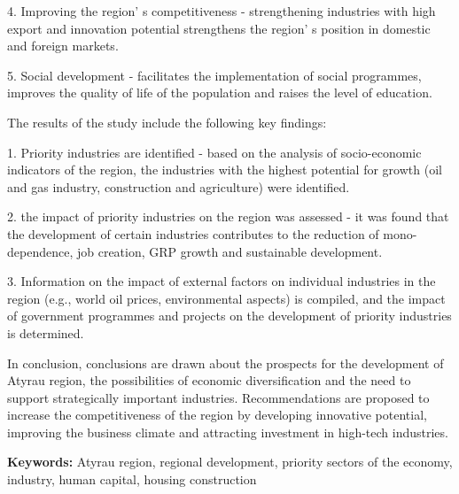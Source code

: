 4. Improving the region' s competitiveness -
strengthening industries with high export and innovation potential
strengthens the region' s position in domestic and
foreign markets.

5. Social development - facilitates the implementation of social
programmes, improves the quality of life of the population and raises
the level of education.

The results of the study include the following key findings:

1. Priority industries are identified - based on the analysis of
socio-economic indicators of the region, the industries with the highest
potential for growth (oil and gas industry, construction and
agriculture) were identified.

2. the impact of priority industries on the region was assessed - it was
found that the development of certain industries contributes to the
reduction of mono-dependence, job creation, GRP growth and sustainable
development.

3. Information on the impact of external factors on individual
industries in the region (e.g., world oil prices, environmental aspects)
is compiled, and the impact of government programmes and projects on the
development of priority industries is determined.

In conclusion, conclusions are drawn about the prospects for the
development of Atyrau region, the possibilities of economic
diversification and the need to support strategically important
industries. Recom\-mendations are proposed to increase the competitiveness
of the region by developing innovative potential, improving the business
climate and attracting investment in high-tech industries.

{\bfseries Keywords:} Atyrau region, regional development, priority sectors
of the economy, industry, human capital, housing construction

